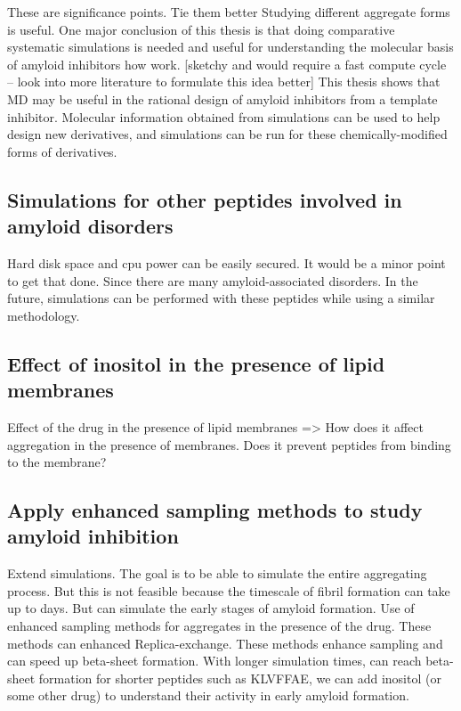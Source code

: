 These are significance points.  Tie them better Studying different aggregate forms is useful.  One major conclusion of this thesis is that doing comparative systematic simulations is needed and useful for understanding the molecular basis of amyloid inhibitors how work.
[sketchy and would require a fast compute cycle -- look into more literature to formulate this idea better] This thesis shows that MD may be useful in the rational design of amyloid inhibitors from a template inhibitor. Molecular information obtained from simulations can be used to help design new derivatives, and simulations can be run for these chemically-modified forms of derivatives. 

\subsection{Simulations for other peptides involved in amyloid disorders}
Hard disk space and cpu power can be easily secured.  It would be a minor point to get that done.  Since there are many amyloid-associated disorders. In the future, simulations can be performed with these peptides while using a similar methodology. 

\subsection{Effect of inositol in the presence of lipid membranes}
Effect of the drug in the presence of lipid membranes => How does it affect aggregation in the presence of membranes. Does it prevent peptides from binding to the membrane?

\subsection{Apply enhanced sampling methods to study amyloid inhibition}
Extend simulations. The goal is to be able to simulate the entire aggregating process.  But this is not feasible because the timescale of fibril formation can take up to days. But can simulate the early stages of amyloid formation.  Use of enhanced sampling methods for aggregates in the presence of the drug.  These methods can enhanced Replica-exchange.  These methods enhance sampling and can speed up beta-sheet formation. With longer simulation times, can reach beta-sheet formation for shorter peptides such as KLVFFAE, we can add inositol (or some other drug) to understand their activity in early amyloid formation.


